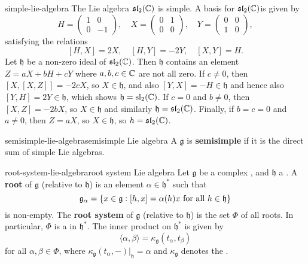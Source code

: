 \begin{example}{simple-lie-algebra}
    The Lie algebra $\mathfrak{sl}_2(\mathbb{C})$ is simple. A basis for $\mathfrak{sl}_2(\mathbb{C})$is given by
    \[ H = \begin{pmatrix} 1 & 0 \\ 0 & -1 \end{pmatrix}, \quad X = \begin{pmatrix} 0 & 1 \\ 0 & 0 \end{pmatrix}, \quad Y = \begin{pmatrix} 0 & 0 \\ 1 & 0 \end{pmatrix} , \]
    satisfying the relations
    \[ [H, X] = 2X, \quad [H, Y] = -2Y, \quad [X, Y] = H . \]
    Let $\mathfrak{h}$ be a non-zero ideal of $\mathfrak{sl}_2(\mathbb{C})$. Then $\mathfrak{h}$ contains an element $Z = aX + bH + cY$ where $a, b, c \in \mathbb{C}$ are not all zero. If $c \ne 0$, then $[X, [X, Z]] = -2cX$, so $X \in \mathfrak{h}$, and also $[Y, X] = -H \in \mathfrak{h}$ and hence also $[Y, H] = 2Y \in \mathfrak{h}$, which shows $\mathfrak{h} = \textup{sl}_2(\mathbb{C})$. If $c = 0$ and $b \ne 0$, then $[X, Z] = -2bX$, so $X \in \mathfrak{h}$ and similarly $\mathfrak{h} = \mathfrak{sl}_2(\mathbb{C})$. Finally, if $b = c = 0$ and $a \ne 0$, then $Z = aX$, so $X \in \mathfrak{h}$, so $h = \mathfrak{sl}_2(\mathbb{C})$.
\end{example}

\begin{topic}{semisimple-lie-algebra}{semisimple Lie algebra}
    A  $\mathfrak{g}$ is \textbf{semisimple} if it is the direct sum of simple Lie algebras.
\end{topic}

\begin{topic}{root-system-lie-algebra}{root system Lie algebra}
    Let $\mathfrak{g}$ be a complex  , and $\mathfrak{h}$ a . A \textbf{root} of $\mathfrak{g}$ (relative to $\mathfrak{h}$) is an element $\alpha \in \mathfrak{h}^*$ such that
    \[ \mathfrak{g}_\alpha = \{ x \in \mathfrak{g} : [h, x] = \alpha(h) x \textup{ for all } h \in \mathfrak{h} \} \]
    is non-empty. The \textbf{root system} of $\mathfrak{g}$ (relative to $\mathfrak{h}$) is the set $\Phi$ of all roots. In particular, $\Phi$ is a  in $\mathfrak{h}^*$. The inner product on $\mathfrak{h}^*$ is given by
    \[ \langle \alpha, \beta \rangle = \kappa_\mathfrak{g}(t_\alpha, t_\beta) \]
    for all $\alpha, \beta \in \Phi$, where $\kappa_\mathfrak{g}(t_\alpha, -)|_\mathfrak{h} = \alpha$ and $\kappa_\mathfrak{g}$ denotes the .
\end{topic}

